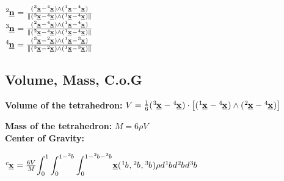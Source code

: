 $\tensor[^2]{\underline{\mathbf{n}}}{} = \frac{(\tensor[^3]{\underline{\mathbf{x}}}{} - \tensor[^4]{\underline{\mathbf{x}}}{}) \wedge
(\tensor[^1]{\underline{\mathbf{x}}}{} -\tensor[^4]{\underline{\mathbf{x}}}{})}{\|(\tensor[^3]{\underline{\mathbf{x}}}{} - \tensor[^4]{\underline{\mathbf{x}}}{}) \wedge
(\tensor[^1]{\underline{\mathbf{x}}}{} -\tensor[^4]{\underline{\mathbf{x}}}{})\|}$ \\

$\tensor[^3]{\underline{\mathbf{n}}}{} = \frac{(\tensor[^2]{\underline{\mathbf{x}}}{} - \tensor[^4]{\underline{\mathbf{x}}}{}) \wedge
(\tensor[^1]{\underline{\mathbf{x}}}{} -\tensor[^4]{\underline{\mathbf{x}}}{})}{\|(\tensor[^2]{\underline{\mathbf{x}}}{} - \tensor[^4]{\underline{\mathbf{x}}}{}) \wedge
(\tensor[^1]{\underline{\mathbf{x}}}{} -\tensor[^4]{\underline{\mathbf{x}}}{})\|}$ \\

$\tensor[^4]{\underline{\mathbf{n}}}{} = \frac{(\tensor[^3]{\underline{\mathbf{x}}}{} - \tensor[^2]{\underline{\mathbf{x}}}{}) \wedge
(\tensor[^1]{\underline{\mathbf{x}}}{} -\tensor[^3]{\underline{\mathbf{x}}}{})}{\|(\tensor[^3]{\underline{\mathbf{x}}}{} - \tensor[^2]{\underline{\mathbf{x}}}{}) \wedge
(\tensor[^1]{\underline{\mathbf{x}}}{} -\tensor[^3]{\underline{\mathbf{x}}}{})\|}$ \\

\subsection*{Volume, Mass, C.o.G}
\smallskip

\textbf{Volume of the tetrahedron:} $ V = \frac{1}{6} (\tensor[^3]{\underline{\mathbf{x}}}{} - \tensor[^4]{\underline{\mathbf{x}}}{}) \cdot \left[ (\tensor[^1]{\underline{\mathbf{x}}}{} -\tensor[^4]{\underline{\mathbf{x}}}{}) \wedge (\tensor[^2]{\underline{\mathbf{x}}}{} -\tensor[^4]{\underline{\mathbf{x}}}{})  \right]$

\textbf{Mass of the tetrahedron:} $M = 6 \rho V$ \\


\textbf{Center of Gravity:}

 $\tensor[^c]{\underline{\mathbf{x}}}{} = \frac{6V}{M}  \mathlarger{\int_{0}^{1} \int_{0}^{1-\tensor[^3]{b}{}} \int_{0}^{1-\tensor[^2]{b}{} - \tensor[^3]{b}{}}} \underline{\mathbf{x}} (\tensor[^1]{b}{}, \tensor[^2]{b}{}, \tensor[^3]{b}{}) \rho d \tensor[^1]{b}{} d \tensor[^2]{b}{} d \tensor[^3]{b}{} $ \\
 
